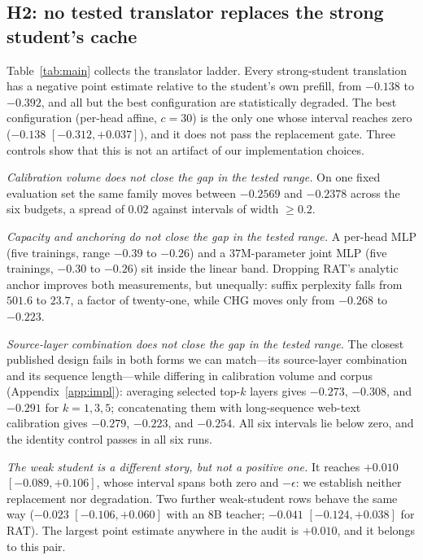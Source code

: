 \documentclass{article} %
\begin{document}
\subsection{H2: no tested translator replaces the strong student's cache}
\label{sec:h2}
Table~\ref{tab:main} collects the translator ladder. Every strong-student
translation has a negative point estimate relative to the student's own
prefill, from $-0.138$ to $-0.392$, and all but the best configuration are
statistically degraded. The best configuration (per-head affine, $c{=}30$) is
the only one whose interval reaches zero ($-0.138$ $[-0.312,+0.037]$), and it does not
pass the replacement gate.
Three controls show that this is not an artifact of our implementation choices.

\emph{Calibration volume does not close the gap in the tested range.} On one fixed evaluation set the same
family moves between $-0.2569$ and $-0.2378$ across the six budgets, a spread
of $0.02$ against intervals of width $\ge 0.2$.

\emph{Capacity and anchoring do not close the gap in the tested range.} A per-head MLP (five
trainings, range $-0.39$ to $-0.26$) and a $37$M-parameter joint MLP (five
trainings, $-0.30$ to $-0.26$) sit inside the linear band. Dropping RAT's
analytic anchor improves both measurements, but unequally: suffix perplexity
falls from $501.6$ to $23.7$, a factor of twenty-one, while CHG moves only from
$-0.268$ to $-0.223$.

\emph{Source-layer combination does not close the gap in the tested range.} The closest published design
fails in both forms we can match---its source-layer combination and its
sequence length---while differing in calibration volume and corpus
(Appendix~\ref{app:impl}): averaging selected top-$k$ layers gives $-0.273$,
$-0.308$, and $-0.291$ for $k{=}1,3,5$; concatenating them with long-sequence
web-text calibration gives $-0.279$, $-0.223$, and $-0.254$. All six intervals
lie below zero, and the identity control passes in all six runs.

\emph{The weak student is a different story, but not a positive one.} It reaches
$+0.010$ $[-0.089,+0.106]$, whose interval spans both zero and $-\epsilon$: we
establish neither replacement nor degradation. Two further weak-student rows
behave the same way ($-0.023$ $[-0.106,+0.060]$ with an $8$B teacher; $-0.041$
$[-0.124,+0.038]$ for RAT). The largest point estimate anywhere in the audit is
$+0.010$, and it belongs to this pair.
\end{document}

